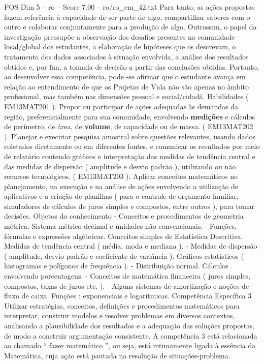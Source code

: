 \begin{textsample}{POS Dim 5 – ro – Score 7.00 – ro/ro\_em\_42.txt}
Para tanto, as ações propostas fazem referência à capacidade de ser parte de algo, compartilhar saberes com o outro e colaborar conjuntamente para a produção de algo.
Outrossim, o papel da investigação pressupõe a observação dos desafios presentes na comunidade local/global dos estudantes, a elaboração de hipóteses que os descrevam, o tratamento dos dados associados à situação envolvida, a análise dos resultados obtidos e, por fim, a tomada de decisão a partir das conclusões obtidas.
Portanto, ao desenvolver essa competência, pode -se afirmar que o estudante avança em relação ao entendimento de que os Projetos de Vida não são apenas no âmbito profissional, mas também nas dimensões pessoal e social/cidadã.
Habilidades ( EM13MAT201 ).
Propor ou participar de ações adequadas às demandas da região, preferencialmente para sua comunidade, envolvendo \textbf{medições} e cálculos de perímetro, de área, de \textbf{volume}, de capacidade ou de massa. ( EM13MAT202 ).
Planejar e executar pesquisa amostral sobre questões relevantes, usando dados coletados diretamente ou em diferentes fontes, e comunicar os resultados por meio de relatório contendo gráficos e interpretação das medidas de tendência central e das medidas de dispersão ( amplitude e desvio padrão ), utilizando ou não recursos tecnológicos. ( EM13MAT203 ).
Aplicar conceitos matemáticos no planejamento, na execução e na análise de ações envolvendo a utilização de aplicativos e a criação de planilhas ( para o controle de orçamento familiar, simuladores de cálculos de juros simples e compostos, entre outros ), para tomar decisões.
Objetos do conhecimento - Conceitos e procedimentos de geometria métrica.
Sistema métrico decimal e unidades não convencionais. - Funções, fórmulas e expressões algébricas.
Conceitos simples de Estatística Descritiva.
Medidas de tendência central ( média, moda e mediana ). - Medidas de dispersão ( amplitude, desvio padrão e coeficiente de variância ).
Gráficos estatísticos ( histogramas e polígonos de frequência ). - Distribuição normal.
Cálculos envolvendo porcentagens. - Conceitos de matemática financeira ( juros simples, compostos, taxas de juros etc. ). - Alguns sistemas de amortização e noções de fluxo de caixa.
Funções : exponenciais e logarítmicas.
Competência Específica 3 Utilizar estratégias, conceitos, definições e procedimentos matemáticos para interpretar, construir modelos e resolver problemas em diversos contextos, analisando a plausibilidade dos resultados e a adequação das soluções propostas, de modo a construir argumentação consistente.
A competência 3 está relacionada ao chamado “ fazer matemático ”, ou seja, está intimamente ligada à essência da Matemática, cuja ação está pautada na resolução de situações-problema.

\end{textsample}
